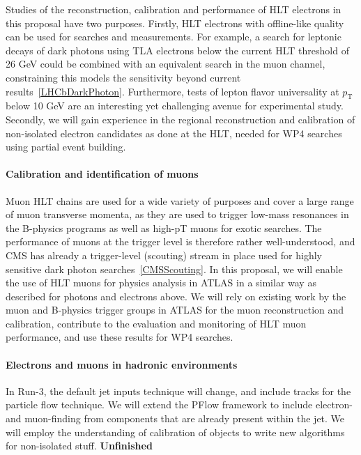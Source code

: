 Studies of the reconstruction, calibration and performance of HLT electrons in this proposal have two purposes. 
Firstly, HLT electrons with offline-like quality can be used for searches and measurements. For example, a search for leptonic decays of dark photons using TLA electrons below the current HLT threshold of 26 GeV could be combined with an equivalent search in the muon channel, constraining this models the sensitivity beyond current results~\ref{LHCbDarkPhoton}. Furthermore, tests of lepton flavor universality at $p_{\mathrm{T}}$ below 10 GeV are an interesting yet challenging avenue for experimental study. 
Secondly, we will gain experience in the regional reconstruction and calibration of non-isolated electron candidates as done at the HLT, needed for WP4 searches using partial event building. 

\paragraph{Calibration and identification of muons} 

Muon HLT chains are used for a wide variety of purposes and cover a large range of muon transverse momenta, as they are used to trigger low-mass resonances in the B-physics programs as well as high-pT muons for exotic searches. 
The performance of muons at the trigger level is therefore rather well-understood, and CMS has already a trigger-level (scouting) stream in place used for highly sensitive dark photon searches~\ref{CMSScouting}. In this proposal, we will enable the use of HLT muons for physics analysis in ATLAS in a similar way as described for photons and electrons above. We will rely on existing work  by the muon and B-physics trigger groups in ATLAS for the muon reconstruction and calibration, contribute to the evaluation and monitoring of HLT muon performance, and use these results for WP4 searches. 

\paragraph{Electrons and muons in hadronic environments}

In Run-3, the default jet inputs technique will change, and include tracks for the particle flow technique. 
We will extend the PFlow framework to include electron- and muon-finding from components that are already present within the jet. 
We will employ the understanding of calibration of objects to write new algorithms for non-isolated stuff. 
\textbf{Unfinished}


